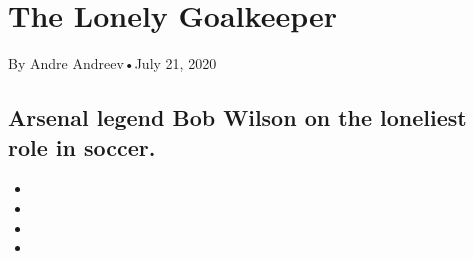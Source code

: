 \hypertarget{the-lonely-goalkeeper-1}{%
\section{The Lonely Goalkeeper}\label{the-lonely-goalkeeper-1}}

By Andre Andreev•July 21, 2020

\hypertarget{arsenal-legend-bob-wilson-on-the-loneliest-role-in-soccer-1}{%
\subsection{Arsenal legend Bob Wilson on the loneliest role in
soccer.}\label{arsenal-legend-bob-wilson-on-the-loneliest-role-in-soccer-1}}

\begin{itemize}
\item
\item
\item
\item
\end{itemize}

